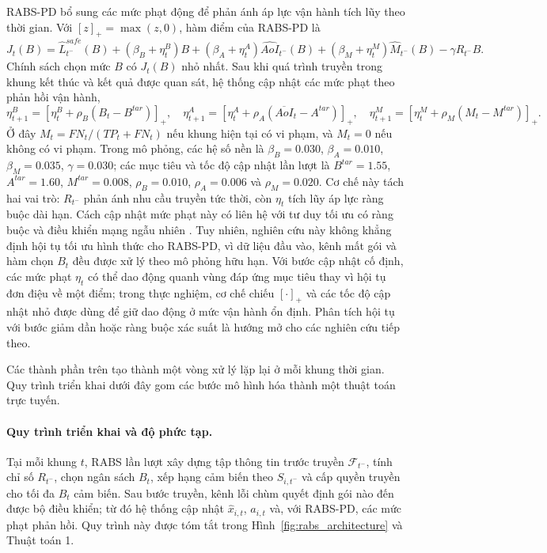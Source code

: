 \documentclass[10pt]{article}
\begin{document}
RABS-PD bổ sung các mức phạt động để phản ánh áp lực vận hành tích lũy theo thời gian. Với $[z]_+=\max(z,0)$, hàm điểm của RABS-PD là
\begin{equation}
J_t(B)=\widehat L^{safe}_{t^-}(B)+(\beta_B+\eta^B_t)B+(\beta_A+\eta^A_t)\widehat{AoI}_{t^-}(B)+(\beta_M+\eta^M_t)\widehat M_{t^-}(B)-\gamma R_{t^-}B.
\end{equation}
Chính sách chọn mức $B$ có $J_t(B)$ nhỏ nhất. Sau khi quá trình truyền trong khung kết thúc và kết quả được quan sát, hệ thống cập nhật các mức phạt theo phản hồi vận hành,
\begin{equation}
\eta^{B}_{t+1}=[\eta^B_t+\rho_B(B_t-B^{tar})]_+,\quad
\eta^{A}_{t+1}=[\eta^A_t+\rho_A(\overline{AoI}_t-A^{tar})]_+,\quad
\eta^{M}_{t+1}=[\eta^M_t+\rho_M(M_t-M^{tar})]_+.
\end{equation}
Ở đây $M_t=FN_t/(TP_t+FN_t)$ nếu khung hiện tại có vi phạm, và $M_t=0$ nếu không có vi phạm. Trong mô phỏng, các hệ số nền là $\beta_B=0.030$, $\beta_A=0.010$, $\beta_M=0.035$, $\gamma=0.030$; các mục tiêu và tốc độ cập nhật lần lượt là $B^{tar}=1.55$, $A^{tar}=1.60$, $M^{tar}=0.008$, $\rho_B=0.010$, $\rho_A=0.006$ và $\rho_M=0.020$. Cơ chế này tách hai vai trò: $R_{t^-}$ phản ánh nhu cầu truyền tức thời, còn $\eta_t$ tích lũy áp lực ràng buộc dài hạn. Cách cập nhật mức phạt này có liên hệ với tư duy tối ưu có ràng buộc và điều khiển mạng ngẫu nhiên \cite{boyd2004convex,neely2010stochastic}. Tuy nhiên, nghiên cứu này không khẳng định hội tụ tối ưu hình thức cho RABS-PD, vì dữ liệu đầu vào, kênh mất gói và hàm chọn $B_t$ đều được xử lý theo mô phỏng hữu hạn. Với bước cập nhật cố định, các mức phạt $\eta_t$ có thể dao động quanh vùng đáp ứng mục tiêu thay vì hội tụ đơn điệu về một điểm; trong thực nghiệm, cơ chế chiếu $[\cdot]_+$ và các tốc độ cập nhật nhỏ được dùng để giữ dao động ở mức vận hành ổn định. Phân tích hội tụ với bước giảm dần hoặc ràng buộc xác suất là hướng mở cho các nghiên cứu tiếp theo.

Các thành phần trên tạo thành một vòng xử lý lặp lại ở mỗi khung thời gian. Quy trình triển khai dưới đây gom các bước mô hình hóa thành một thuật toán trực tuyến.

\paragraph{Quy trình triển khai và độ phức tạp.}
Tại mỗi khung $t$, RABS lần lượt xây dựng tập thông tin trước truyền $\mathcal{F}_{t^-}$, tính chỉ số $R_{t^-}$, chọn ngân sách $B_t$, xếp hạng cảm biến theo $S_{i,t^-}$ và cấp quyền truyền cho tối đa $B_t$ cảm biến. Sau bước truyền, kênh lỗi chùm quyết định gói nào đến được bộ điều khiển; từ đó hệ thống cập nhật $\hat{x}_{i,t}$, $a_{i,t}$ và, với RABS-PD, các mức phạt phản hồi. Quy trình này được tóm tắt trong Hình~\ref{fig:rabs_architecture} và Thuật toán 1.
\end{document}
